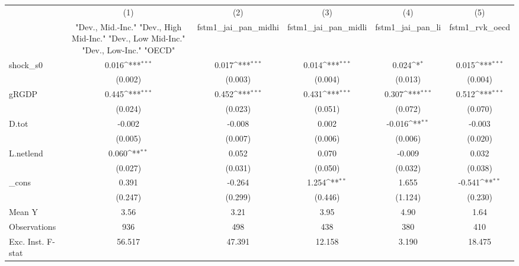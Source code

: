 {
\def\sym#1{\ifmmode^{#1}\else\(^{#1}\)\fi}
\begin{tabular}{l*{5}{c}}
\toprule
            &\multicolumn{1}{c}{(1)}&\multicolumn{1}{c}{(2)}&\multicolumn{1}{c}{(3)}&\multicolumn{1}{c}{(4)}&\multicolumn{1}{c}{(5)}\\
            &\multicolumn{1}{c}{ "Dev., Mid.-Inc." "Dev., High Mid-Inc." "Dev., Low Mid-Inc." "Dev., Low-Inc." "OECD" }&\multicolumn{1}{c}{fstm1\_jai\_pan\_midhi}&\multicolumn{1}{c}{fstm1\_jai\_pan\_midli}&\multicolumn{1}{c}{fstm1\_jai\_pan\_li}&\multicolumn{1}{c}{fstm1\_rvk\_oecd}\\
\midrule
shock\_s0    &       0.016\sym{***}&       0.017\sym{***}&       0.014\sym{***}&       0.024\sym{*}  &       0.015\sym{***}\\
            &     (0.002)         &     (0.003)         &     (0.004)         &     (0.013)         &     (0.004)         \\
\addlinespace
gRGDP       &       0.445\sym{***}&       0.452\sym{***}&       0.431\sym{***}&       0.307\sym{***}&       0.512\sym{***}\\
            &     (0.024)         &     (0.023)         &     (0.051)         &     (0.072)         &     (0.070)         \\
\addlinespace
D.tot       &      -0.002         &      -0.008         &       0.002         &      -0.016\sym{**} &      -0.003         \\
            &     (0.005)         &     (0.007)         &     (0.006)         &     (0.006)         &     (0.020)         \\
\addlinespace
L.netlend   &       0.060\sym{**} &       0.052         &       0.070         &      -0.009         &       0.032         \\
            &     (0.027)         &     (0.031)         &     (0.050)         &     (0.032)         &     (0.038)         \\
\addlinespace
\_cons      &       0.391         &      -0.264         &       1.254\sym{**} &       1.655         &      -0.541\sym{**} \\
            &     (0.247)         &     (0.299)         &     (0.446)         &     (1.124)         &     (0.230)         \\
\midrule
Mean Y      &        3.56         &        3.21         &        3.95         &        4.90         &        1.64         \\
Observations&         936         &         498         &         438         &         380         &         410         \\
Exc. Inst. F-stat&      56.517         &      47.391         &      12.158         &       3.190         &      18.475         \\
\bottomrule
\end{tabular}
}
